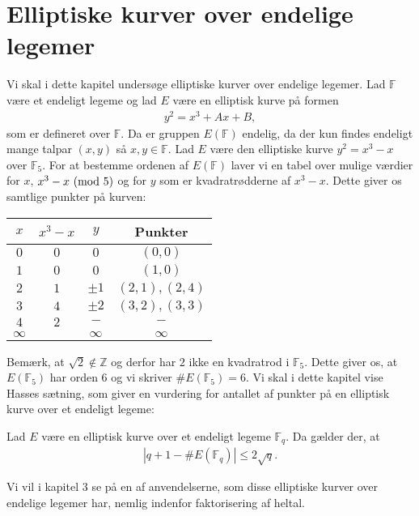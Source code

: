 \chapter{Elliptiske kurver over endelige legemer}

Vi skal i dette kapitel undersøge elliptiske kurver over endelige legemer. 
Lad $\mathbb{F}$ være et endeligt legeme og lad $E$ være en elliptisk kurve på
formen 
\begin{align*}
	y^2 = x^3 + Ax + B,
\end{align*}
som er defineret over $\mathbb{F}$. Da er gruppen $E(\mathbb{F})$ endelig, da 
der kun findes endeligt mange talpar $(x, y)$ så $x, y \in \mathbb{F}$. Lad 
$E$ være den elliptiske kurve $y^2 = x^3 - x$ over $\mathbb{F}_5$. For at bestemme
ordenen af $E(\mathbb{F})$ laver vi en tabel over mulige værdier for $x$, $x^3 - x \ (\mathrm{mod} \ 5)$
og for $y$ som er kvadratrødderne af $x^3 - x$. Dette giver os samtlige punkter på kurven:

\begin{center}
\begin{tabular}{c c c c }
$x$ & $x^3 - x$ & $y$ & Punkter \\ 
\hline
$0$ & $0$ & $0$ & $(0, 0)$ \\ 
$1$ & $0$ & $0$ & $(1, 0)$ \\ 
$2$ & $1$ & $\pm 1$ & $(2, 1), (2, 4)$ \\ 
$3$ & $4$ & $\pm 2$ & $(3, 2), (3, 3)$ \\ 
$4$ & $2$ & $-$ & $-$ \\ 
$\infty$ & & $\infty$ & $\infty$ \\
\end{tabular} 
\end{center}

Bemærk, at $\sqrt{2} \notin \mathbb{Z}$ og derfor har $2$ ikke en kvadratrod i $\mathbb{F}_5$.
Dette giver os, at $E(\mathbb{F}_5)$ har orden $6$ og vi skriver $\#E(\mathbb{F}_5)=6$. Vi skal
i dette kapitel vise Hasses sætning, som giver en vurdering for antallet af punkter på en elliptisk
kurve over et endeligt legeme:

\begin{theorem}[Hasse]
Lad $E$ være en elliptisk kurve over et endeligt legeme $\mathbb{F}_q$. Da gælder der, at 
\begin{align*}
	|q + 1 - \#E(\mathbb{F}_q)| \leq 2 \sqrt{q}.
\end{align*}
\end{theorem}

Vi vil i kapitel 3 se på en af anvendelserne, som disse elliptiske kurver over endelige legemer har, 
nemlig indenfor faktorisering af heltal.


